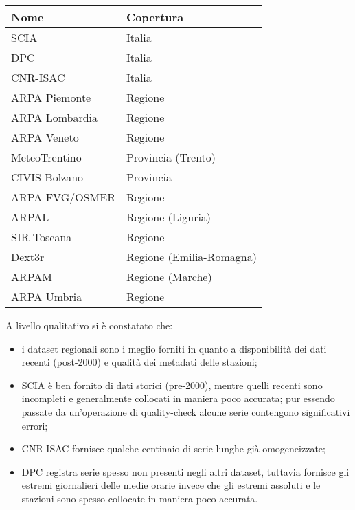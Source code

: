 \begin{table}[h]
  \centering
  \begin{tabular}{l l}
    \toprule
    Nome & Copertura \\
    \midrule
    SCIA & Italia \\
    DPC & Italia \\
    CNR-ISAC & Italia \\
    ARPA Piemonte & Regione \\
    ARPA Lombardia & Regione \\
    ARPA Veneto & Regione \\
    MeteoTrentino & Provincia (Trento) \\
    CIVIS Bolzano & Provincia \\
    ARPA FVG/OSMER & Regione \\
    ARPAL & Regione (Liguria) \\
    SIR Toscana & Regione \\
    Dext3r & Regione (Emilia-Romagna) \\
    ARPAM & Regione (Marche) \\
    ARPA Umbria & Regione \\
    \bottomrule
  \end{tabular}
\end{table}

A livello qualitativo si è constatato che:

\begin{itemize}
  \item
    i dataset regionali sono i meglio forniti in quanto a disponibilità dei dati recenti (post-2000) e qualità dei metadati delle stazioni;
  \item
    SCIA è ben fornito di dati storici (pre-2000), mentre quelli recenti sono incompleti e generalmente collocati in maniera poco accurata; pur essendo passate da un'operazione di quality-check alcune serie contengono significativi errori;
  \item
    CNR-ISAC fornisce qualche centinaio di serie lunghe già omogeneizzate;
  \item
    DPC registra serie spesso non presenti negli altri dataset, tuttavia fornisce gli estremi giornalieri delle medie orarie invece che gli estremi assoluti e le stazioni sono spesso collocate in maniera poco accurata.
\end{itemize}


